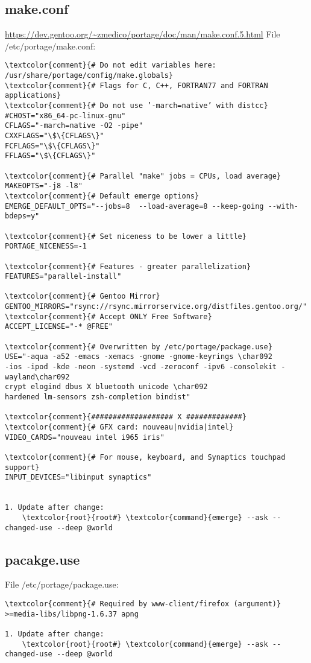 \documentclass[10pt, a4paper, onecolumn, openany]{book}         %
\begin{document}
\subsection{make.conf}
\label{make.conf}
\underline{\url{https://dev.gentoo.org/~zmedico/portage/doc/man/make.conf.5.html}}\newline
File \textcolor{file}{/etc/portage/make.conf}:
\begin{Verbatim}[commandchars=\\\{\}]
\textcolor{comment}{# Do not edit variables here: /usr/share/portage/config/make.globals}
\textcolor{comment}{# Flags for C, C++, FORTRAN77 and FORTRAN applications}
\textcolor{comment}{# Do not use ’-march=native’ with distcc}
#CHOST="x86_64-pc-linux-gnu"
CFLAGS="-march=native -O2 -pipe"
CXXFLAGS="\$\{CFLAGS\}"
FCFLAGS="\$\{CFLAGS\}"
FFLAGS="\$\{CFLAGS\}"

\textcolor{comment}{# Parallel "make" jobs = CPUs, load average}
MAKEOPTS="-j8 -l8" 
\textcolor{comment}{# Default emerge options}
EMERGE_DEFAULT_OPTS="--jobs=8  --load-average=8 --keep-going --with-bdeps=y"

\textcolor{comment}{# Set niceness to be lower a little}
PORTAGE_NICENESS=-1

\textcolor{comment}{# Features - greater parallelization}
FEATURES="parallel-install"

\textcolor{comment}{# Gentoo Mirror}
GENTOO_MIRRORS="rsync://rsync.mirrorservice.org/distfiles.gentoo.org/"
\textcolor{comment}{# Accept ONLY Free Software}
ACCEPT_LICENSE="-* @FREE"

\textcolor{comment}{# Overwritten by /etc/portage/package.use}
USE="-aqua -a52 -emacs -xemacs -gnome -gnome-keyrings \char092
-ios -ipod -kde -neon -systemd -vcd -zeroconf -ipv6 -consolekit -wayland\char092
crypt elogind dbus X bluetooth unicode \char092
hardened lm-sensors zsh-completion bindist"

\textcolor{comment}{################### X #############}
\textcolor{comment}{# GFX card: nouveau|nvidia|intel}
VIDEO_CARDS="nouveau intel i965 iris"

\textcolor{comment}{# For mouse, keyboard, and Synaptics touchpad support}
INPUT_DEVICES="libinput synaptics"


1. Update after change:
    \textcolor{root}{root#} \textcolor{command}{emerge} --ask --changed-use --deep @world
\end{Verbatim}


\subsection{pacakge.use}
\label{package.use}
File \textcolor{file}{/etc/portage/package.use}:
\begin{Verbatim}[commandchars=\\\{\}]
\textcolor{comment}{# Required by www-client/firefox (argument)}
>=media-libs/libpng-1.6.37 apng

1. Update after change:
    \textcolor{root}{root#} \textcolor{command}{emerge} --ask --changed-use --deep @world
\end{Verbatim}
\end{document}
